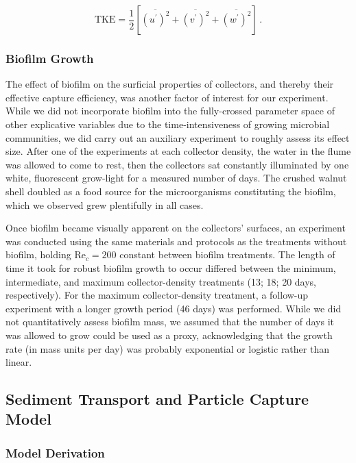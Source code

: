 \documentclass[geosciences,article,submit,moreauthors,pdftex]{Definitions/mdpi}
\newcommand\Rey{\mathrm{Re}}
\begin{document}
\begin{equation}
    \text{TKE} = \frac{1}{2}[\overline{(u^\prime)^2} + \overline{(v^\prime)^2} + \overline{(w^\prime)^2}]\,.
    \label{eqn:TKE}
\end{equation}

\subsubsection{Biofilm Growth}

The effect of biofilm on the surficial properties of collectors, and thereby their effective capture efficiency, was another factor of interest for our experiment. While we did not incorporate biofilm into the fully-crossed parameter space of other explicative variables due to the time-intensiveness of growing microbial communities, we did carry out an auxiliary experiment to roughly assess its effect size. After one of the experiments at each collector density, the water in the flume was allowed to come to rest, then the collectors sat constantly illuminated by one white, fluorescent grow-light for a measured number of days. The crushed walnut shell doubled as a food source for the microorganisms constituting the biofilm, which we observed grew plentifully in all cases.

Once biofilm became visually apparent on the collectors' surfaces, an experiment was conducted using the same materials and protocols as the treatments without biofilm, holding $\Rey_c = 200$ constant between biofilm treatments. The length of time it took for robust biofilm growth to occur differed between the minimum, intermediate, and maximum collector-density treatments (13; 18; 20 days, respectively). For the maximum collector-density treatment, a follow-up experiment with a longer growth period (46 days) was performed. While we did not quantitatively assess biofilm mass, we assumed that the number of days it was allowed to grow could be used as a proxy, acknowledging that the growth rate (in mass units per day) was probably exponential or logistic rather than linear.

\subsection{Sediment Transport and Particle Capture Model}

\subsubsection{Model Derivation}
\end{document}
